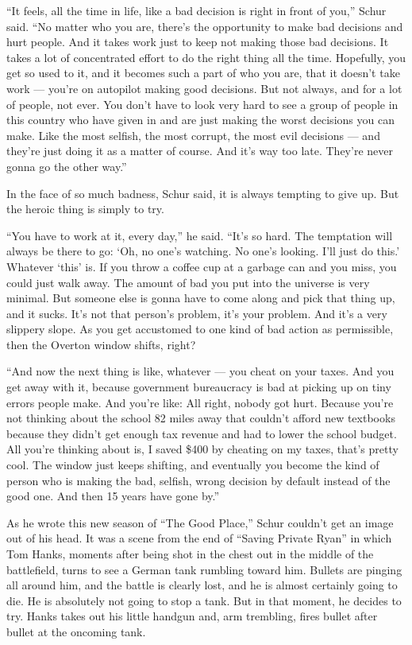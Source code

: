 ``It feels, all the time in life, like a bad decision is right in front
of you,'' Schur said. ``No matter who you are, there's the opportunity
to make bad decisions and hurt people. And it takes work just to keep
not making those bad decisions. It takes a lot of concentrated effort to
do the right thing all the time. Hopefully, you get so used to it, and
it becomes such a part of who you are, that it doesn't take work ---
you're on autopilot making good decisions. But not always, and for a lot
of people, not ever. You don't have to look very hard to see a group of
people in this country who have given in and are just making the worst
decisions you can make. Like the most selfish, the most corrupt, the
most evil decisions --- and they're just doing it as a matter of course.
And it's way too late. They're never gonna go the other way.''

In the face of so much badness, Schur said, it is always tempting to
give up. But the heroic thing is simply to try.

``You have to work at it, every day,'' he said. ``It's so hard. The
temptation will always be there to go: `Oh, no one's watching. No one's
looking. I'll just do this.' Whatever `this' is. If you throw a coffee
cup at a garbage can and you miss, you could just walk away. The amount
of bad you put into the universe is very minimal. But someone else is
gonna have to come along and pick that thing up, and it sucks. It's not
that person's problem, it's your problem. And it's a very slippery
slope. As you get accustomed to one kind of bad action as permissible,
then the Overton window shifts, right?

``And now the next thing is like, whatever --- you cheat on your taxes.
And you get away with it, because government bureaucracy is bad at
picking up on tiny errors people make. And you're like: All right,
nobody got hurt. Because you're not thinking about the school 82 miles
away that couldn't afford new textbooks because they didn't get enough
tax revenue and had to lower the school budget. All you're thinking
about is, I saved \$400 by cheating on my taxes, that's pretty cool. The
window just keeps shifting, and eventually you become the kind of person
who is making the bad, selfish, wrong decision by default instead of the
good one. And then 15 years have gone by.''

As he wrote this new season of ``The Good Place,'' Schur couldn't get an
image out of his head. It was a scene from the end of ``Saving Private
Ryan'' in which Tom Hanks, moments after being shot in the chest out in
the middle of the battlefield, turns to see a German tank rumbling
toward him. Bullets are pinging all around him, and the battle is
clearly lost, and he is almost certainly going to die. He is absolutely
not going to stop a tank. But in that moment, he decides to try. Hanks
takes out his little handgun and, arm trembling, fires bullet after
bullet at the oncoming tank.

